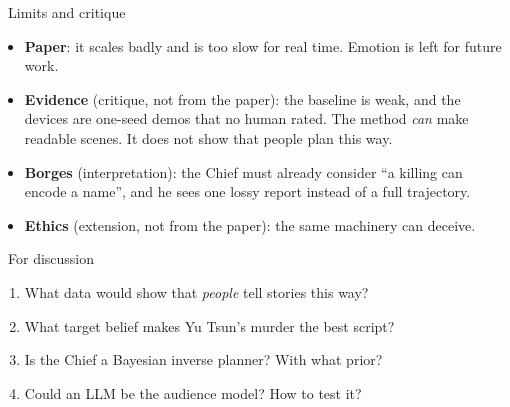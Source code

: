\documentclass[10pt,a4paper]{article}
\begin{document}
\begin{minipage}[t]{0.49\linewidth}
\begin{mblock}{\faExclamationTriangle\ Limits and critique}
\begin{itemize}
  \item \textbf{Paper}: it scales badly and is too slow for real time. Emotion is left for future work.
  \item \textbf{Evidence} (critique, not from the paper): the baseline is weak, and the devices are one-seed demos that no human rated. The method \emph{can} make readable scenes. It does not show that people plan this way.
  \item \textbf{Borges} (interpretation): the Chief must already consider ``a killing can encode a name'', and he sees one lossy report instead of a full trajectory.
  \item \textbf{Ethics} (extension, not from the paper): the same machinery can deceive.
\end{itemize}
\end{mblock}

\begin{malert}{\faComments\ For discussion}
\begin{enumerate}
  \item What data would show that \emph{people} tell stories this way?
  \item What target belief makes Yu Tsun's murder the best script?
  \item Is the Chief a Bayesian inverse planner? With what prior?
  \item Could an LLM be the audience model? How to test it?
\end{enumerate}
\end{malert}

\end{minipage}\hfill
\end{document}

